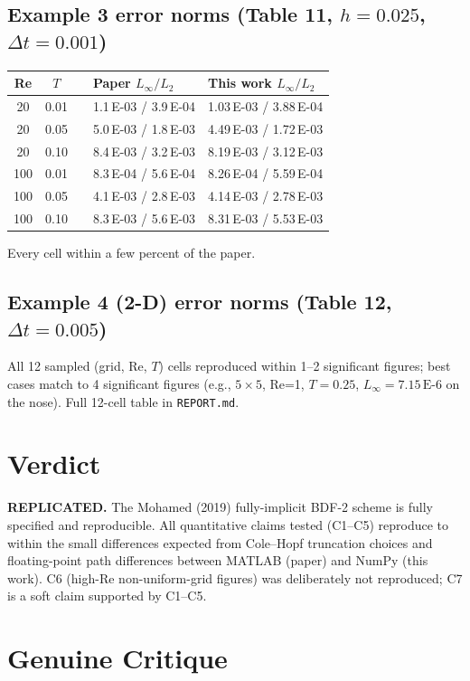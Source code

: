 \documentclass[11pt]{article}
\begin{document}
\subsection{Example 3 error norms (Table 11, \(h{=}0.025\), \(\Delta t{=}0.001\))}
\begin{center}
\begin{tabular}{cccll}
\toprule
Re & \(T\) & & Paper \(L_\infty / L_2\) & This work \(L_\infty / L_2\) \\
\midrule
20 & 0.01 & & 1.1\,E-03 / 3.9\,E-04 & 1.03\,E-03 / 3.88\,E-04 \\
20 & 0.05 & & 5.0\,E-03 / 1.8\,E-03 & 4.49\,E-03 / 1.72\,E-03 \\
20 & 0.10 & & 8.4\,E-03 / 3.2\,E-03 & 8.19\,E-03 / 3.12\,E-03 \\
100& 0.01 & & 8.3\,E-04 / 5.6\,E-04 & 8.26\,E-04 / 5.59\,E-04 \\
100& 0.05 & & 4.1\,E-03 / 2.8\,E-03 & 4.14\,E-03 / 2.78\,E-03 \\
100& 0.10 & & 8.3\,E-03 / 5.6\,E-03 & 8.31\,E-03 / 5.53\,E-03 \\
\bottomrule
\end{tabular}
\end{center}
Every cell within a few percent of the paper.

\subsection{Example 4 (2-D) error norms (Table 12, \(\Delta t{=}0.005\))}
All 12 sampled (grid, Re, \(T\)) cells reproduced within 1--2 significant figures;
best cases match to 4 significant figures (e.g., \(5\times5\), Re=1, \(T{=}0.25\),
\(L_\infty = 7.15\,\text{E-6}\) on the nose). Full 12-cell table in
\texttt{REPORT.md}.

\section{Verdict}
\textbf{REPLICATED.} The Mohamed (2019) fully-implicit BDF-2 scheme is fully
specified and reproducible. All quantitative claims tested (C1--C5) reproduce
to within the small differences expected from Cole--Hopf truncation choices
and floating-point path differences between MATLAB (paper) and NumPy (this
work). C6 (high-Re non-uniform-grid figures) was deliberately not reproduced;
C7 is a soft claim supported by C1--C5.

\section{Genuine Critique}\label{sec:critique}
\end{document}
